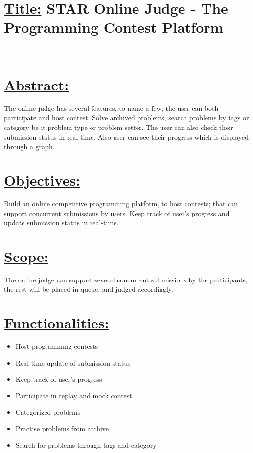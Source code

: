 
\section*{\underline{Title:} STAR Online Judge - The Programming Contest Platform\\}
\vspace{50pt}
\section*{\underline{\\Abstract:}}
The online judge has several features, to name a few; the user can both participate and host
contest. Solve archived problems, search problems by tags or category be it problem type or
problem setter. The user can also check their submission status in real-time. Also user can see
their progress which is displayed through a graph.

\section*{\underline{Objectives:}}
Build an online competitive programming platform, to host contests; that can support concurrent
submissions by users. Keep track of user's progress and update submission status in real-time.

\section*{\underline{Scope:}}
The online judge can support several concurrent submissions by the participants, the rest will be
placed in queue, and judged accordingly.

\section*{\underline{Functionalities:}}
\begin{itemize}
  \item Host programming contests
  \item Real-time update of submission status
  \item Keep track of user’s progress
  \item Participate in replay and mock contest
  \item Categorized problems
  \item Practise problems from archive
  \item Search for problems through tags and category
\end{itemize}

